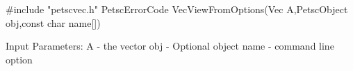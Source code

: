 #include "petscvec.h"   
PetscErrorCode  VecViewFromOptions(Vec A,PetscObject obj,const char name[])

Input Parameters:
A    - the vector
obj  - Optional object
name - command line option 
